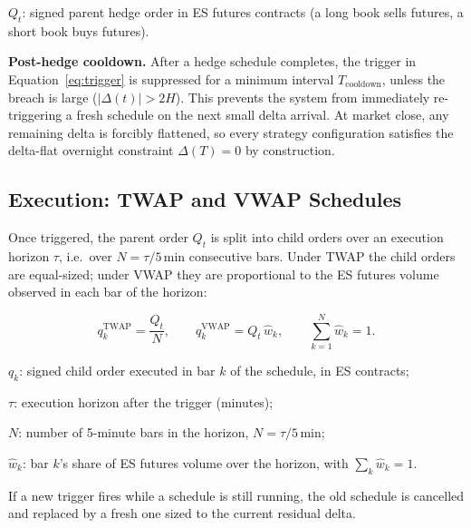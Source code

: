 \documentclass{article}
\begin{document}
\begin{vardefs}
\item $Q_t$: signed parent hedge order in ES futures contracts (a long book sells
  futures, a short book buys futures).
\end{vardefs}

\textbf{Post-hedge cooldown.} After a hedge schedule completes, the trigger in
Equation~\eqref{eq:trigger} is suppressed for a minimum interval $T_{\text{cooldown}}$,
unless the breach is large ($\lvert \Delta(t) \rvert > 2H$). This prevents the system from
immediately re-triggering a fresh schedule on the next small delta arrival. At market
close, any remaining delta is forcibly flattened, so every strategy configuration
satisfies the delta-flat overnight constraint $\Delta(T) = 0$ by construction.

\subsection{Execution: TWAP and VWAP Schedules}

Once triggered, the parent order $Q_t$ is split into child orders over an execution
horizon $\tau$, i.e.\ over $N = \tau / 5\,\text{min}$ consecutive bars. Under TWAP the
child orders are equal-sized; under VWAP they are proportional to the ES futures volume
observed in each bar of the horizon:

\begin{eqbox}
\begin{equation}
q_k^{\text{TWAP}} = \frac{Q_t}{N},
\qquad
q_k^{\text{VWAP}} = Q_t\,\hat{w}_k,
\qquad
\sum_{k=1}^{N} \hat{w}_k = 1.
\end{equation}
\end{eqbox}

\begin{vardefs}
\item $q_k$: signed child order executed in bar $k$ of the schedule, in ES contracts;
\item $\tau$: execution horizon after the trigger (minutes);
\item $N$: number of 5-minute bars in the horizon, $N = \tau / 5\,\text{min}$;
\item $\hat{w}_k$: bar $k$'s share of ES futures volume over the horizon, with
  $\sum_k \hat{w}_k = 1$.
\end{vardefs}

If a new trigger fires while a schedule is still running, the old schedule is cancelled
and replaced by a fresh one sized to the current residual delta.
\end{document}

